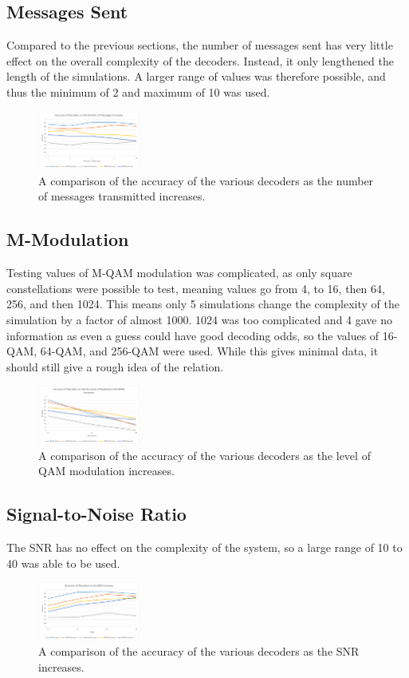 \documentclass[conference]{IEEEtran}
\begin{document}
\subsection{Messages Sent}
Compared to the previous sections, the number of messages sent has very little effect on the overall complexity of the decoders. Instead, it only lengthened the length of the simulations. A larger range of values was therefore possible, and thus the minimum of 2 and maximum of 10 was used.
\begin{figure}[h!]
    \centering
    \includegraphics[width=0.30\textwidth]{TGraph.png}
    \caption{A comparison of the accuracy of the various decoders as the number of messages transmitted increases.}
    \label{fig:TGraph}
\end{figure}

\subsection{M-Modulation}
Testing values of M-QAM modulation was complicated, as only square constellations were possible to test, meaning values go from 4, to 16, then 64, 256, and then 1024. This means only 5 simulations change the complexity of the simulation by a factor of almost 1000. 1024 was too complicated and 4 gave no information as even a guess could have good decoding odds, so the values of 16-QAM, 64-QAM, and 256-QAM were used. While this gives minimal data, it should still give a rough idea of the relation.
\begin{figure}[h!]
    \centering
    \includegraphics[width=0.30\textwidth]{MGraph.png}
    \caption{A comparison of the accuracy of the various decoders as the level of QAM modulation increases.}
    \label{fig:MGraph}
\end{figure}

\subsection{Signal-to-Noise Ratio}
The SNR has no effect on the complexity of the system, so a large range of 10 to 40 was able to be used.
\begin{figure}[h!]
    \centering
    \includegraphics[width=0.30\textwidth]{SNRGraph.png}
    \caption{A comparison of the accuracy of the various decoders as the SNR increases.}
    \label{fig:SNRGraph}
\end{figure}
\end{document}
